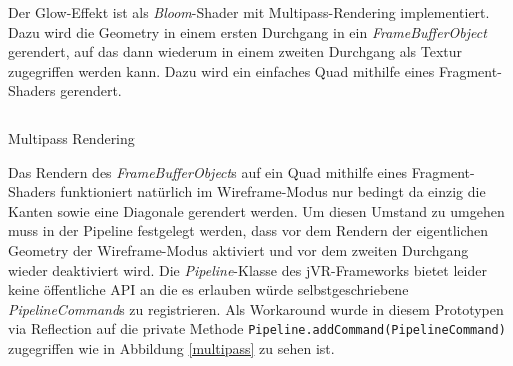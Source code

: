 \documentclass[a4paper]{article}
\begin{document}
Der Glow-Effekt ist als \textit{Bloom}-Shader mit Multipass-Rendering implementiert. Dazu wird die Geometry in einem ersten Durchgang in ein \textit{FrameBufferObject} gerendert, auf das dann wiederum in einem zweiten Durchgang als Textur zugegriffen werden kann. Dazu wird ein einfaches Quad mithilfe eines Fragment-Shaders gerendert.

\begin{listing}[H]
\inputminted[firstline=34, lastline=53]{scala}{../scala/org/whiskeysierra/powpow/PowPow.scala}
\caption{Multipass Rendering}
\label{multipass}
\end{listing}

Das Rendern des \textit{FrameBufferObject}s auf ein Quad mithilfe eines Fragment-Shaders funktioniert natürlich im Wireframe-Modus nur bedingt da einzig die Kanten sowie eine Diagonale gerendert werden. Um diesen Umstand zu umgehen muss in der Pipeline festgelegt werden, dass vor dem Rendern der eigentlichen Geometry der Wireframe-Modus aktiviert und vor dem zweiten Durchgang wieder deaktiviert wird. Die \textit{Pipeline}-Klasse des jVR-Frameworks bietet leider keine öffentliche API an die es erlauben würde selbstgeschriebene \textit{PipelineCommand}s zu registrieren. Als Workaround wurde in diesem Prototypen via Reflection auf die private Methode \texttt{Pipeline.addCommand(PipelineCommand)} zugegriffen wie in Abbildung \ref{multipass} zu sehen ist.

\newpage
\nocite{pewpewgame}
\nocite{jinput}
\nocite{scala}
\nocite{jbullet}
\nocite{BaileyCunningham200905}
\printbibliography

\listoffigures

\renewcommand\listoflistingscaption{Quellcodeverzeichnis}
\listoflistings
\end{document}

